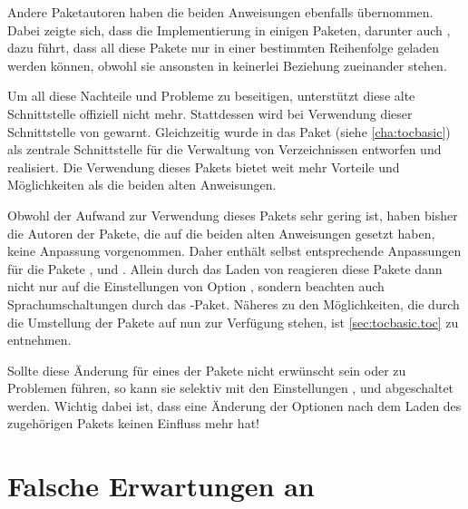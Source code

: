 Andere Paketautoren haben die beiden Anweisungen ebenfalls übernommen. Dabei
zeigte sich, dass die Implementierung in einigen Paketen, darunter auch
, dazu führt, dass all diese Pakete nur in einer bestimmten
Reihenfolge geladen werden können, obwohl sie ansonsten in keinerlei Beziehung
zueinander stehen.

Um all diese Nachteile und Probleme zu beseitigen, unterstützt \KOMAScript{}
diese alte Schnittstelle offiziell nicht mehr. Stattdessen wird bei Verwendung
dieser Schnittstelle von \KOMAScript{} gewarnt. Gleichzeitig wurde in
\KOMAScript{} das Paket
 (siehe
\autoref{cha:tocbasic}) als zentrale Schnittstelle für die Verwaltung von
Verzeichnissen entworfen und realisiert. Die Verwendung dieses Pakets bietet
weit mehr Vorteile und Möglichkeiten als die beiden alten Anweisungen.

Obwohl der Aufwand zur Verwendung dieses Pakets sehr gering ist, haben bisher
die Autoren der Pakete, die auf die beiden alten Anweisungen gesetzt haben,
keine Anpassung vorgenommen. Daher enthält  selbst
entsprechende Anpassungen für die Pakete
,
 und
. Allein durch das Laden von
 reagieren diese Pakete dann nicht nur auf die Einstellungen
von Option
,
sondern beachten auch Sprachumschaltungen durch das
-Paket. Näheres zu den Möglichkeiten, die
durch die Umstellung der Pakete auf  nun zur Verfügung
stehen, ist \autoref{sec:tocbasic.toc} zu entnehmen.

Sollte diese Änderung für eines der Pakete nicht erwünscht sein oder zu
Problemen führen, so kann sie selektiv mit den Einstellungen
,
und
abgeschaltet werden. Wichtig dabei ist, dass eine Änderung
der Optionen nach dem Laden des zugehörigen Pakets keinen Einfluss mehr hat!


\section{Falsche Erwartungen an }


